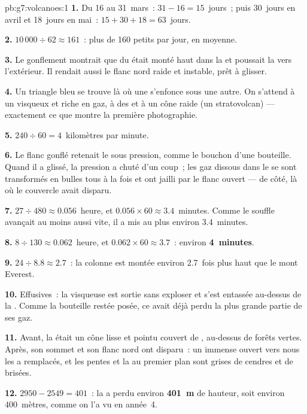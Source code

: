 \begin{solution}{pb:g7:volcanoes:1}
\textbf{1.} Du 16 au 31~mars~: $31 - 16 = 15$~jours~; puis 30~jours en
avril et 18~jours en mai~: $15 + 30 + 18 = 63$~jours.

\textbf{2.} $10\,000 \div 62 \approx 161$~: plus de 160 petits  par
jour, en moyenne.

\textbf{3.} Le gonflement montrait que du  était monté haut dans la
 et poussait la  vers l'extérieur. Il rendait aussi le flanc
nord raide et instable, prêt à glisser.

\textbf{4.} Un triangle bleu se trouve là où une  s'enfonce sous une
autre. On s'attend à un  visqueux et riche en gaz, à des  et à un cône raide (un stratovolcan) --- exactement ce que
montre la première photographie.

\textbf{5.} $240 \div 60 = 4$~kilomètres par minute.

\textbf{6.} Le flanc gonflé retenait le  sous pression, comme le
bouchon d'une bouteille. Quand il a glissé, la pression a chuté d'un
coup~; les gaz dissous dans le  se sont transformés en bulles tous à
la fois et ont jailli par le flanc ouvert --- de côté, là où le couvercle
avait disparu.

\textbf{7.} $27 \div 480 \approx 0.056$~heure, et $0.056 \times 60 \approx
3.4$~minutes. Comme le souffle avançait au moins aussi vite, il a mis au
plus environ 3.4~minutes.

\textbf{8.} $8 \div 130 \approx 0.062$~heure, et $0.062 \times 60 \approx
3.7$~: environ \textbf{4~minutes}.

\textbf{9.} $24 \div 8.8 \approx 2.7$~: la colonne est montée environ
2.7~fois plus haut que le mont Everest.

\textbf{10.} Effusives~: la  visqueuse est sortie sans exploser et
s'est entassée au-dessus de la . Comme la bouteille restée posée, ce
 avait déjà perdu la plus grande partie de ses gaz.

\textbf{11.} Avant, la  était un cône lisse et pointu couvert de
, au-dessus de forêts vertes. Après, son sommet et son flanc nord ont
disparu~: un immense  ouvert vers nous les a remplacés, et les
pentes et la  au premier plan sont grises de cendres et de 
brisées.

\textbf{12.} $2950 - 2549 = 401$~: la  a perdu environ
\textbf{401~m} de hauteur, soit environ 400~mètres, comme on l'a vu en
année~4.
\end{solution}
